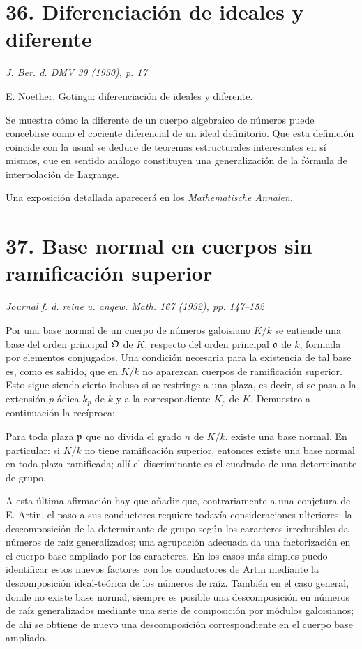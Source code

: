 \section*{36. Diferenciación de ideales y diferente}

\begin{center}
\emph{J. Ber. d. DMV 39 (1930), p. 17}
\end{center}

E. Noether, Gotinga: diferenciación de ideales y diferente.

Se muestra cómo la diferente de un cuerpo algebraico de números puede concebirse como el cociente diferencial de un ideal definitorio. Que esta definición coincide con la usual se deduce de teoremas estructurales interesantes en sí mismos, que en sentido análogo constituyen una generalización de la fórmula de interpolación de Lagrange.

Una exposición detallada aparecerá en los \emph{Mathematische Annalen}.

\section*{37. Base normal en cuerpos sin ramificación superior}

\begin{center}
\emph{Journal f. d. reine u. angew. Math. 167 (1932), pp. 147--152}
\end{center}

Por una base normal de un cuerpo de números galoisiano \(K/k\) se entiende una base del orden principal \(\mathfrak O\) de \(K\), respecto del orden principal \(\mathfrak o\) de \(k\), formada por elementos conjugados. Una condición necesaria para la existencia de tal base es, como es sabido, que en \(K/k\) no aparezcan cuerpos de ramificación superior. Esto sigue siendo cierto incluso si se restringe a una plaza, es decir, si se pasa a la extensión \(p\)-ádica \(k_p\) de \(k\) y a la correspondiente \(K_p\) de \(K\). Demuestro a continuación la recíproca:

Para toda plaza \(\mathfrak p\) que no divida el grado \(n\) de \(K/k\), existe una base normal. En particular: si \(K/k\) no tiene ramificación superior, entonces existe una base normal en toda plaza ramificada; allí el discriminante es el cuadrado de una determinante de grupo.

A esta última afirmación hay que añadir que, contrariamente a una conjetura de E. Artin, el paso a sus conductores requiere todavía consideraciones ulteriores: la descomposición de la determinante de grupo según los caracteres irreducibles da números de raíz generalizados; una agrupación adecuada da una factorización en el cuerpo base ampliado por los caracteres. En los casos más simples puedo identificar estos nuevos factores con los conductores de Artin mediante la descomposición ideal-teórica de los números de raíz. También en el caso general, donde no existe base normal, siempre es posible una descomposición en números de raíz generalizados mediante una serie de composición por módulos galoisianos; de ahí se obtiene de nuevo una descomposición correspondiente en el cuerpo base ampliado.


